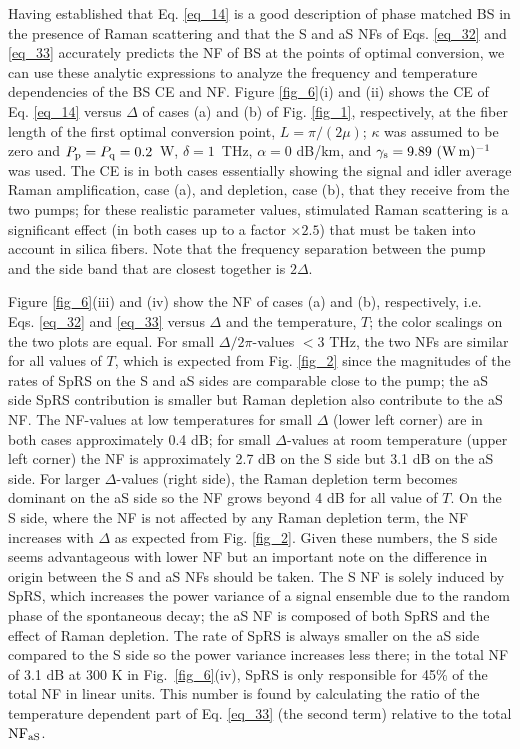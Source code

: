 \documentclass[10pt,letterpaper]{article}
\begin{document}
Having established that Eq. \eqref{eq_14} is a good description of phase matched BS in the presence of Raman scattering and that the S and aS NFs of Eqs. \eqref{eq_32} and \eqref{eq_33} accurately predicts the NF of BS at the points of optimal conversion, we can use these analytic expressions to analyze the frequency and temperature dependencies of the BS CE and NF. Figure \ref{fig_6}(i) and (ii) shows the CE of Eq. \eqref{eq_14} versus $\Delta$ of cases (a) and (b) of Fig. \ref{fig_1}, respectively, at the fiber length of the first optimal conversion point, $L = \pi/(2\mu)$; $\kappa$ was assumed to be zero and \mbox{$P_{\rm p}=P_{\rm q} = 0.2$ W}, \mbox{$\delta = 1$ THz}, $\alpha = 0$ dB/km, and $\gamma_{\rm s} = 9.89 \ {\rm (W\, m)^{-1}}$ was used. The CE is in both cases essentially showing the signal and idler average Raman amplification, case (a), and depletion, case (b), that they receive from the two pumps; for these realistic parameter values, stimulated Raman scattering is a significant effect (in both cases up to a factor $\times 2.5$) that must be taken into account in silica fibers. Note that the frequency separation between the pump and the side band that are closest together is $2\Delta$.

Figure \ref{fig_6}(iii) and (iv) show the NF of cases (a) and (b), respectively, i.e. Eqs. \eqref{eq_32} and \eqref{eq_33} versus $\Delta$ and the temperature, $T$; the color scalings on the two plots are equal. For small $\Delta/2\pi$-values $<3$ THz, the two NFs are similar for all values of $T$, which is expected from Fig. \ref{fig_2} since the magnitudes of the rates of SpRS on the S and aS sides are comparable close to the pump; the aS side SpRS contribution is smaller but Raman depletion also contribute to the aS NF. The NF-values at low temperatures for small $\Delta$ (lower left corner) are in both cases approximately 0.4 dB; for small $\Delta$-values at room temperature (upper left corner) the NF is approximately 2.7 dB on the S side but 3.1 dB on the aS side. For larger $\Delta$-values (right side), the Raman depletion term becomes dominant on the aS side so the NF grows beyond 4 dB for all value of $T$. On the S side, where the NF is not affected by any Raman depletion term, the NF increases with $\Delta$ as expected from Fig. \ref{fig_2}. Given these numbers, the S side seems advantageous with lower NF but an important note on the difference in origin between the S and aS NFs should be taken. The S NF is solely induced by SpRS, which increases the power variance of a signal ensemble due to the random phase of the spontaneous decay; the aS NF is composed of both SpRS and the effect of Raman depletion. The rate of SpRS is always smaller on the aS side compared to the S side so the power variance increases less there; in the total NF of 3.1 dB at 300 K in \mbox{Fig. \ref{fig_6}(iv)}, SpRS is only responsible for 45\% of the total NF in linear units. This number is found by calculating the ratio of the temperature dependent part of Eq. \eqref{eq_33} (the second term) relative to the total $\rm NF_{aS}$.
\end{document}
